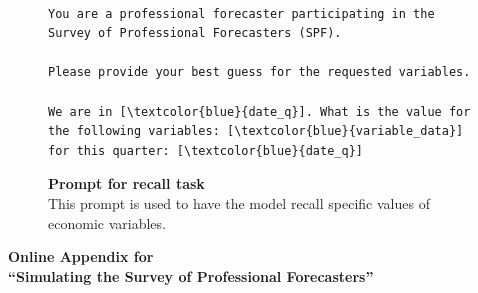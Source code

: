 \documentclass[11pt,letterpaper]{scrartcl}
\begin{document}
\begin{figure}[h!]
    \centering
    \caption{\textbf{Prompt for recall task}
    \vspace{5pt}\\
    \footnotesize{This prompt is used to have the model recall specific values of economic variables.} 
    \vspace{5pt}
    }

    \label{prmpt:recall} 

    \begin{tcolorbox}[colback=gray!10, colframe=gray!10, width=\textwidth]
\scriptsize
\begin{Verbatim}[commandchars=\\\{\}]

You are a professional forecaster participating in the Survey of Professional Forecasters (SPF).

Please provide your best guess for the requested variables.
            
We are in [\textcolor{blue}{date_q}]. What is the value for the following variables: [\textcolor{blue}{variable_data}] 
for this quarter: [\textcolor{blue}{date_q}]

\end{Verbatim}
\end{tcolorbox}
\end{figure}
\clearpage



\newpage\clearpage
\appendix
\renewcommand{\headrulewidth}{0pt}
\renewcommand{\footrulewidth}{0pt}
\lhead{}
\setcounter{figure}{0}
\renewcommand{\figurename}{Figure}
\renewcommand{\theequation}{\Alph{section}.\arabic{equation}}
\renewcommand*\thetable{\Alph{section}.\arabic{table}}
\renewcommand*\thefigure{\Alph{section}.\arabic{figure}}
\renewcommand{\thepage}{A\arabic{page}} 
\setcounter{page}{1}
\fancyhead{}
\pagestyle{fancy}


\begin{center}
        \vspace*{4cm}\Large{\textbf{Online Appendix for\\[2ex]
        ``Simulating the Survey of Professional Forecasters'' }}\vspace{.81cm}

        \large{\textit{} }

\end{center}
\end{document}
